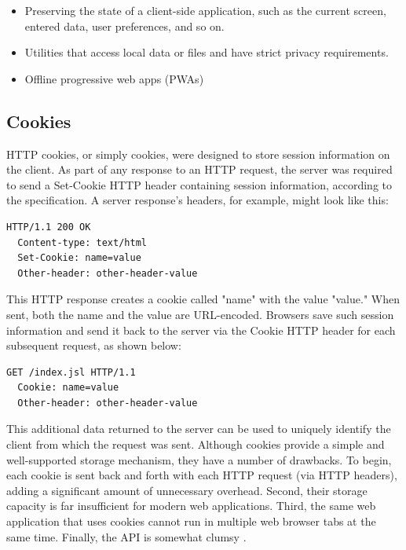 \begin{itemize}
  \item Preserving the state of a client-side application, such as the current screen, entered data, user preferences, and so on.
  \item Utilities that access local data or files and have strict privacy requirements.
  \item Offline progressive web apps (PWAs)
\end{itemize}

\subsection*{Cookies}
HTTP cookies, or simply cookies, were designed to store session information on the client. As part of any response to an HTTP request, the server was required to send a Set-Cookie HTTP header containing session information, according to the specification. A server response's headers, for example, might look like this:

\begin{lstlisting}[language={}, caption={Cookie server response's headers}]
  HTTP/1.1 200 OK
  Content-type: text/html
  Set-Cookie: name=value
  Other-header: other-header-value
\end{lstlisting}

This HTTP response creates a cookie called "name" with the value "value." When sent, both the name and the value are URL-encoded. Browsers save such session information and send it back to the server via the Cookie HTTP header for each subsequent request, as shown below:

\begin{lstlisting}[language={}, caption={Cookie HTTP header}]
  GET /index.jsl HTTP/1.1
  Cookie: name=value
  Other-header: other-header-value
\end{lstlisting}

This additional data returned to the server can be used to uniquely identify the client from which the request was sent. Although cookies provide a simple and well-supported storage mechanism, they have a number of drawbacks. To begin, each cookie is sent back and forth with each HTTP request (via HTTP headers), adding a significant amount of unnecessary overhead. Second, their storage capacity is far insufficient for modern web applications. Third, the same web application that uses cookies cannot run in multiple web browser tabs at the same time. Finally, the API is somewhat clumsy \autocite{kessin2011programming, macdonald2013html5}.

